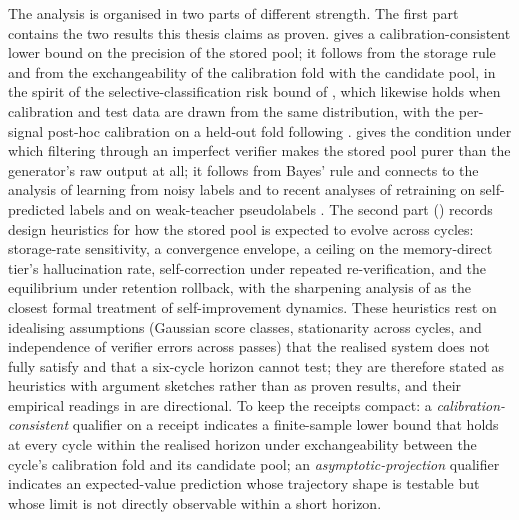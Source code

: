 The analysis is organised in two parts of different strength. The first part contains the two results this thesis claims as proven.  gives a calibration-consistent lower bound on the precision of the stored pool; it follows from the storage rule and from the exchangeability of the calibration fold with the candidate pool, in the spirit of the selective-classification risk bound of \cite{geifman2017selective}, which likewise holds when calibration and test data are drawn from the same distribution, with the per-signal post-hoc calibration on a held-out fold following \cite{niculescu2005predicting}.  gives the condition under which filtering through an imperfect verifier makes the stored pool purer than the generator's raw output at all; it follows from Bayes' rule and connects to the analysis of learning from noisy labels \cite{natarajan2013learning} and to recent analyses of retraining on self-predicted labels \cite{das2025retraining} and on weak-teacher pseudolabels \cite{lang2024w2s}. The second part () records design heuristics for how the stored pool is expected to evolve across cycles: storage-rate sensitivity, a convergence envelope, a ceiling on the memory-direct tier's hallucination rate, self-correction under repeated re-verification, and the equilibrium under retention rollback, with the sharpening analysis of \cite{huang2025sharpening} as the closest formal treatment of self-improvement dynamics. These heuristics rest on idealising assumptions (Gaussian score classes, stationarity across cycles, and independence of verifier errors across passes) that the realised system does not fully satisfy and that a six-cycle horizon cannot test; they are therefore stated as heuristics with argument sketches rather than as proven results, and their empirical readings in  are directional. To keep the receipts compact: a \emph{calibration-consistent} qualifier on a receipt indicates a finite-sample lower bound that holds at every cycle within the realised horizon under exchangeability between the cycle's calibration fold and its candidate pool; an \emph{asymptotic-projection} qualifier indicates an expected-value prediction whose trajectory shape is testable but whose limit is not directly observable within a short horizon.

